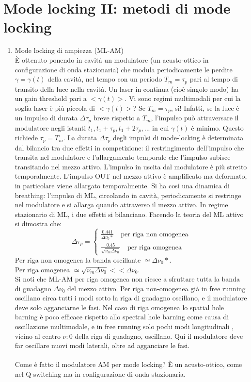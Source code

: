 \documentclass{book}
\def \D {\Delta}
\theoremstyle{remark}
\begin{document}
\chapter{Mode locking II: metodi di mode locking}
\begin{enumerate}
\item Mode locking di ampiezza (ML-AM)\\
È ottenuto ponendo in cavità un modulatore (un acusto-ottico in configurazione di onda stazionaria) che modula periodicamente le perdite $\gamma = \gamma(t)$ della cavità, nel tempo con un periodo $T_m = \tau_p$ pari al tempo di transito della luce nella cavità.
Un laser in continua (cioè singolo modo) ha un gain threshold pari a $<\gamma(t)>$. Vi sono regimi multimodali per cui la soglia laser è più piccola di $<\gamma(t)>$?
Se $T_m = \tau_p$, si! Infatti, se la luce è un impulso di durata $\D\tau_p$ breve rispetto a $T_m$, l'impulso può attraversare il modulatore negli istanti $t_1, t_1 +\tau_p, t_1 +2\tau_p, ...$ in cui $\gamma(t)$ è minimo.
Questo richiede $\tau_p = T_m$.
La durata $\D\tau_p$ degli impulsi di mode-locking è determinata dal bilancio tra due effetti in competizione:
il restringimento dell'impulso che transita nel modulatore e l'allargamento temporale che l'impulso subisce transitando nel mezzo attivo.
L'impulso in uscita dal modulatore è più stretto temporalmente.
L'impulso OUT nel mezzo attivo è amplificato ma deformato, in particolare viene allargato temporalmente.
Si ha così una dinamica di breathing: l'impulso di ML, circolando in cavità, periodicamente si restringe nel modulatore e si allarga quando attraverso il mezzo attivo. In regime stazionario di ML, i due effetti si bilanciano. Facendo la teoria del ML attivo si dimostra che:
\begin{equation*}
\D\tau_p = \begin{cases}
\frac{0.441}{\D\nu_0*} \quad \text{per riga non omogenea}\\
\frac{0.45}{\sqrt{\nu_m\D\nu_0}} \quad \text{per riga omogenea}
\end{cases}
\end{equation*}
Per riga non omogenea la banda oscillante $\simeq \D\nu_0*$.\\
Per riga omogenea $\simeq \sqrt{\nu_m\D\nu_0} << \D\nu_0$.\\
Si noti che ML-AM per riga omogenea non riesce a sfruttare tutta la banda di guadagno $\D\nu_0$ del mezzo attivo. Per riga non-omogenea già in free running oscillano circa tutti i modi sotto la riga di guadagno oscillano, e il modulatore deve solo agganciarne le fasi. Nel caso di riga omogenea lo spatial hole barning è poco efficace rispetto allo spectral hole barning come causa di oscillazione multimodale, e in free running solo pochi modi longitudinali , vicino al centro $\nu:0$ della riga di guadagno, oscillano. Qui il modulatore deve far oscillare nuovi modi laterali, oltre ad agganciare le fasi.\\
\\
Come è fatto il modulatore AM per mode locking?
È un acusto-ottico, come nel Q-switching ma in configurazione di onda stazionaria.


\end{enumerate}
\end{document}
